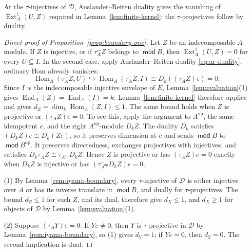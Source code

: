 \documentclass[a4paper,reqno,10pt]{amsart}
\theoremstyle{definition}
\numberwithin{equation}{section}
\DeclareMathOperator{\moduleCategory}{\mathsf{mod}}
\renewcommand{\mod}{\moduleCategory}
\DeclareMathOperator{\Hom}{Hom}
\DeclareMathOperator{\Ext}{Ext}
\DeclareMathOperator{\End}{End}
\newcommand{\op}{\mathrm{op}}
\newcommand{\cD}{\mathcal D}
\newcommand{\Dk}{D_k}
\begin{document}
At the \(\tau\)-injectives of \(\cD\), Auslander--Reiten duality gives
the vanishing of \(\Ext_A^1(U,Z)\) required in
Lemma~\ref{lem:finite-kernel}; the \(\tau\)-projectives follow by duality.

\begin{proof}[Direct proof of Proposition~\ref{prop:boundary-one}]
Let \(Z\) be an indecomposable \(A\)-module. If \(Z\) is injective, or if \(\tau_A^-Z\) belongs to \(\mod B\),
then \(\Ext_A^1(U,Z)=0\) for every \(U\subseteq I\).
In the second case, apply Auslander--Reiten duality
\eqref{eq:ar-duality}; ordinary Hom already vanishes:
\[
 \Hom_A(\tau_A^-Z,U)\hookrightarrow\Hom_A(\tau_A^-Z,I)
 \cong\Dk((\tau_A^-Z)e)=0.
\]
Since \(I\) is the indecomposable injective envelope of \(E\),
Lemma~\ref{lem:evaluation}(1) gives \(\End_A(Z)=\End_A(I)=k\).
Lemma~\ref{lem:finite-kernel} therefore
applies and gives \(d_Z=\dim_k\Hom_A(Z,I)\leq1\).
The same bound holds when \(Z\) is projective or \((\tau_A Z)e=0\).
To see this, apply the argument to \(A^\op\), the same idempotent \(e\), and
the right \(A^\op\)-module \(\Dk Z\). The duality \(\Dk\) satisfies
\((\Dk Z)e\cong\Dk(Ze)\), so it preserves dimension at \(e\) and sends
\(\mod B\) to \(\mod B^\op\). It preserves directedness, exchanges
projectives with injectives, and satisfies
\(\Dk\tau_A Z\cong\tau_{A^\op}^-\Dk Z\). Hence \(Z\) is projective or has
\((\tau_A Z)e=0\) exactly when \(\Dk Z\) is injective or has
\((\tau_{A^\op}^-\Dk Z)e=0\).

(1) By Lemma~\ref{rem:iyama-boundary}, every \(\tau\)-injective of \(\cD\)
is either injective over \(A\) or has its inverse translate in \(\mod B\),
and dually for \(\tau\)-projectives. The bound \(d_Z\leq1\) for such \(Z\),
and its dual, therefore give
\(d_X\leq1\), and \(d_X\geq1\) for objects of \(\cD\) by
Lemma~\ref{lem:evaluation}(1).

(2) Suppose \((\tau_A Y)e=0\). If \(Ye\ne0\), then \(Y\) is
\(\tau\)-projective in \(\cD\) by Lemma~\ref{rem:iyama-boundary}, so (1)
gives \(d_Y=1\); if \(Ye=0\), then \(d_Y=0\). The second implication is
dual.
\end{proof}
\end{document}
